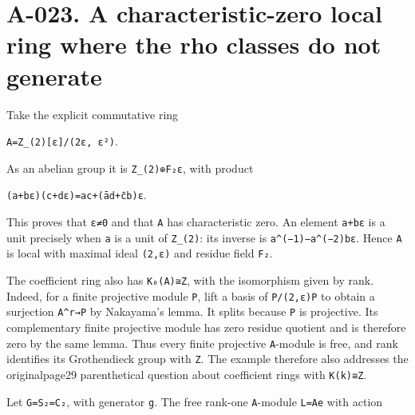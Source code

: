 \documentclass[
  10pt,
]{article}
\begin{document}
\section{A-023. A characteristic-zero local ring where the rho classes
do not
generate}\label{a-023.-a-characteristic-zero-local-ring-where-the-rho-classes-do-not-generate}

Take the explicit commutative ring

\texttt{\small A=\allowbreak{}Z\_\allowbreak{}(\allowbreak{}2)\allowbreak{}[\allowbreak{}ε]\allowbreak{}/\allowbreak{}(\allowbreak{}2ε,\allowbreak{} ε²)\allowbreak{}}.

As an abelian group it is
\texttt{\small Z\_\allowbreak{}(\allowbreak{}2)\allowbreak{}⊕\allowbreak{}F₂ε},
with product

\texttt{\small (\allowbreak{}a+\allowbreak{}bε)\allowbreak{}(\allowbreak{}c+\allowbreak{}dε)\allowbreak{}=\allowbreak{}ac+\allowbreak{}(\allowbreak{}ād+\allowbreak{}c̄b)\allowbreak{}ε}.

This proves that \texttt{\small ε≠0} and that \texttt{\small A} has
characteristic zero. An element \texttt{\small a+\allowbreak{}bε} is a
unit precisely when \texttt{\small a} is a unit of
\texttt{\small Z\_\allowbreak{}(\allowbreak{}2)\allowbreak{}}: its
inverse is
\texttt{\small a\textasciicircum{}(\allowbreak{}−1)\allowbreak{}−a\textasciicircum{}(\allowbreak{}−2)\allowbreak{}bε}.
Hence \texttt{\small A} is local with maximal ideal
\texttt{\small (\allowbreak{}2,\allowbreak{}ε)\allowbreak{}} and residue
field \texttt{\small F₂}.

The coefficient ring also has
\texttt{\small K₀(\allowbreak{}A)\allowbreak{}≅Z}, with the isomorphism
given by rank. Indeed, for a finite projective module \texttt{\small P},
lift a basis of
\texttt{\small P/\allowbreak{}(\allowbreak{}2,\allowbreak{}ε)\allowbreak{}P}
to obtain a surjection
\texttt{\small A\textasciicircum{}r→\allowbreak{}P} by Nakayama's lemma.
It splits because \texttt{\small P} is projective. Its complementary
finite projective module has zero residue quotient and is therefore zero
by the same lemma. Thus every finite projective \texttt{\small A}-module
is free, and rank identifies its Grothendieck group with
\texttt{\small Z}. The example therefore also addresses the
originalpage29 parenthetical question about coefficient rings with
\texttt{\small K(\allowbreak{}k)\allowbreak{}≅Z}.

Let \texttt{\small G=\allowbreak{}S₂=\allowbreak{}C₂}, with generator
\texttt{\small g}. The free rank-one \texttt{\small A}-module
\texttt{\small L=\allowbreak{}Ae} with action
\end{document}
